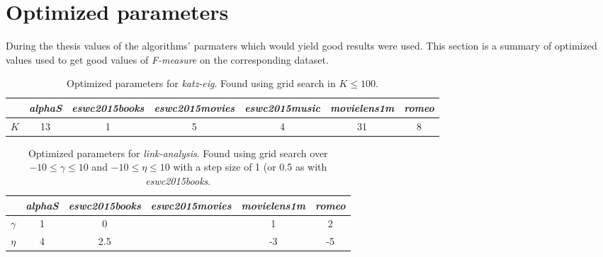 
\chapter{Optimized parameters}\label{app:opt_params}

During the thesis values of the algorithms' parmaters which would yield good results were used. This section is a summary of optimized values used to get good values of \textit{F-measure} on the corresponding dataset.

\begin{table}[h!]
    \centering
    \begin{tabular}{| c | c | c | c | c | c | c |}
        \hline
        \textbf{}   & \textit{alphaS}   & \textit{eswc2015books} & \textit{eswc2015movies} & \textit{eswc2015music} & \textit{movielens1m}   & \textit{romeo} \\ \hline
        $K$         & 13                & 1                      & 5                       & 4                       & 31                     & 8              \\ \hline
    \end{tabular}
    \caption{Optimized parameters for \textit{katz-eig}. Found using grid search in $K \leq 100$.}
    \label{tab:katzeig_params_used}
\end{table}

\begin{table}[h!]
    \centering
    \begin{tabular}{| c | c | c | c | c | c | }
        \hline
        \textbf{}   & \textit{alphaS}   & \textit{eswc2015books} & \textit{eswc2015movies} & \textit{movielens1m}   & \textit{romeo} \\ \hline
        $\gamma$    & 1                 & 0                      &                         & 1                      & 2              \\ \hline
        $\eta$      & 4                 & 2.5                    &                         & -3                     & -5             \\ \hline
    \end{tabular}
    \caption{Optimized parameters for \textit{link-analysis}. Found using grid search over $-10 \leq \gamma \leq 10$ and $-10 \leq \eta \leq 10$ with a step size of 1 (or 0.5 as with \textit{eswc2015books}.}
    \label{tab:linkanalysis_params_used}
\end{table}


